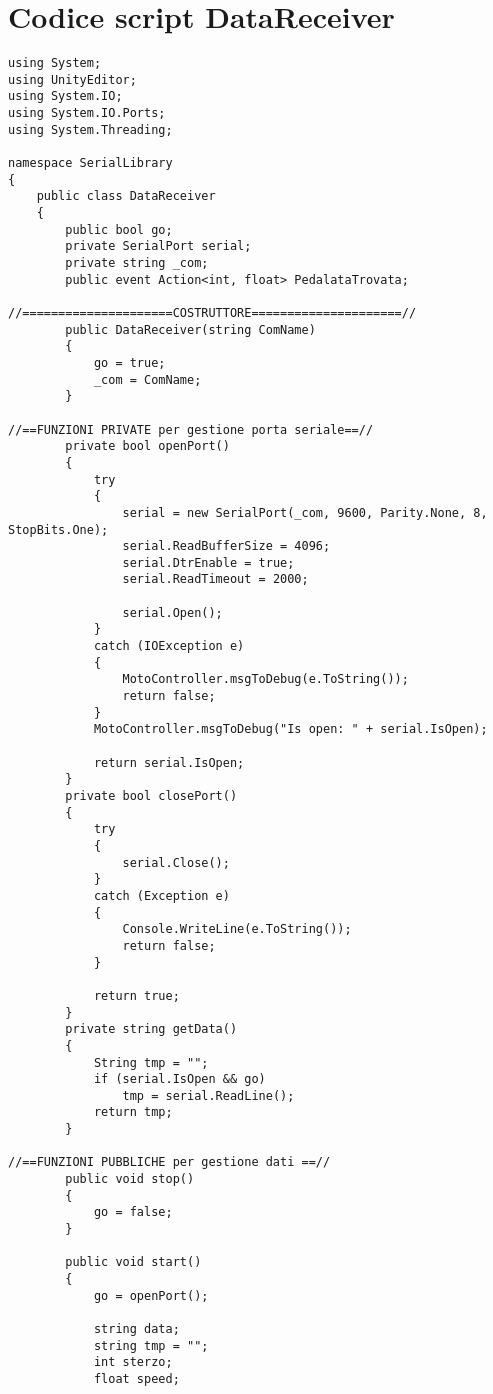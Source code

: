 \chapter{Codice script \-DataReceiver}
\label{receiver}
\thispagestyle{empty}

\begin{lstlisting}
using System;
using UnityEditor;
using System.IO;
using System.IO.Ports;
using System.Threading;

namespace SerialLibrary
{
    public class DataReceiver
    {
        public bool go;
        private SerialPort serial;
        private string _com;
        public event Action<int, float> PedalataTrovata;

//=====================COSTRUTTORE=====================//
        public DataReceiver(string ComName)
        {
            go = true;
            _com = ComName;
        }
		
//==FUNZIONI PRIVATE per gestione porta seriale==//
        private bool openPort()
        {
            try
            {
                serial = new SerialPort(_com, 9600, Parity.None, 8, StopBits.One);
                serial.ReadBufferSize = 4096;
                serial.DtrEnable = true;
                serial.ReadTimeout = 2000;

                serial.Open();
            }
            catch (IOException e)
            {
                MotoController.msgToDebug(e.ToString());
                return false;
            }
            MotoController.msgToDebug("Is open: " + serial.IsOpen);

            return serial.IsOpen;
        }
        private bool closePort()
        {
            try
            {
                serial.Close();
            }
            catch (Exception e)
            {
                Console.WriteLine(e.ToString());
                return false;
            }

            return true;
        }
        private string getData()
        {
            String tmp = "";
            if (serial.IsOpen && go)
                tmp = serial.ReadLine();
            return tmp;
        }

//==FUNZIONI PUBBLICHE per gestione dati ==//
        public void stop()
        {
            go = false;
        }

        public void start()
        {
            go = openPort();

            string data;
            string tmp = "";
            int sterzo;
            float speed;


\end{lstlisting}
